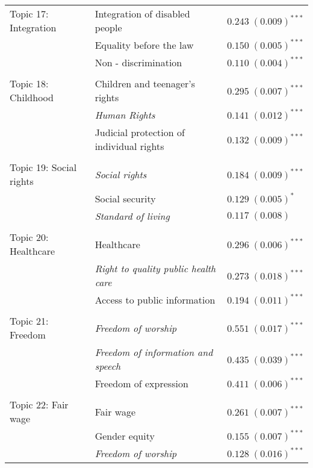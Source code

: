 \documentclass[onecolumn]{article}
\begin{document}
\begin{table}
\begin{center}
\begin{tabular}{l l l }
Topic 17: Integration & Integration of disabled people                       & $0.243 \; (0.009)^{***}$ \\
& Equality before the law                         & $0.150 \; (0.005)^{***}$ \\
& Non - discrimination                             & $0.110 \; (0.004)^{***}$ \\
\hline \\[-1.8ex]
Topic 18: Childhood & Children and teenager's rights                       & $0.295 \; (0.007)^{***}$ \\
& \textit{Human Rights}                                  & $0.141 \; (0.012)^{***}$ \\
& Judicial protection of individual rights         & $0.132 \; (0.009)^{***}$ \\
\hline \\[-1.8ex]
Topic 19: Social rights & \textit{Social rights}                                        & $0.184 \; (0.009)^{***}$ \\
& Social security                                 & $0.129 \; (0.005)^{*}$   \\
& \textit{Standard of living}                                   & $0.117 \; (0.008)$       \\
\hline \\[-1.8ex]
Topic 20: Healthcare & Healthcare                                  & $0.296 \; (0.006)^{***}$ \\
& \textit{Right to quality public health care}              & $0.273 \; (0.018)^{***}$ \\
& Access to public information                         & $0.194 \; (0.011)^{***}$ \\
\hline \\[-1.8ex]
Topic 21: Freedom & \textit{Freedom of worship}                                 & $0.551 \; (0.017)^{***}$ \\
& \textit{Freedom of information and speech}                    & $0.435 \; (0.039)^{***}$ \\
& Freedom of expression                                & $0.411 \; (0.006)^{***}$ \\
\hline \\[-1.8ex]
Topic 22: Fair wage & Fair wage                                            & $0.261 \; (0.007)^{***}$ \\
& Gender equity                                    & $0.155 \; (0.007)^{***}$ \\
& \textit{Freedom of worship}                               & $0.128 \; (0.016)^{***}$ \\

\end{tabular}
\end{center}
\end{table}
\end{document}
